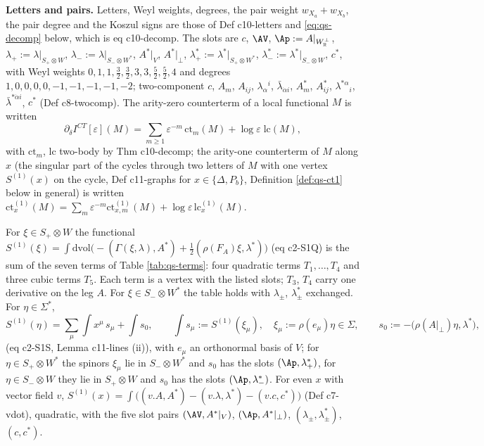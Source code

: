 \textbf{Letters and pairs.} Letters, Weyl weights, degrees, the pair weight $w_{X_a}+w_{X_b}$, the pair degree and the Koszul signs are those of Def c10-letters and \eqref{eq:qs-decomp} below, which is eq c10-decomp. The slots are $c$, $\AV$, $\Ap:=A|_{W_{\mathbb R}^\perp}$, $\lambda_+:=\lambda|_{S_+\otimes W}$, $\lambda_-:=\lambda|_{S_-\otimes W^*}$, $A^*|_V$, $A^*|_\perp$, $\lambda^*_+:=\lambda^*|_{S_+\otimes W^*}$, $\lambda^*_-:=\lambda^*|_{S_-\otimes W}$, $c^*$, with Weyl weights $0,1,1,\tfrac32,\tfrac32,3,3,\tfrac52,\tfrac52,4$ and degrees $1,0,0,0,0,-1,-1,-1,-1,-2$; two-component $c$, $A_m$, $A_{ij}$, $\lambda_\alpha{}^i$, $\bar\lambda_{\dot\alpha i}$, $A^*_m$, $A^*_{ij}$, $\lambda^{*\alpha}{}_i$, $\bar\lambda^{*\dot\alpha i}$, $c^*$ (Def c8-twocomp). The arity-zero counterterm of a local functional $M$ is written
\[
\partial_\delta I^{CT}[\varepsilon](M)=\sum_{m\ge1}\varepsilon^{-m}\,\mathrm{ct}_m(M)+\log\varepsilon\;\mathrm{lc}(M),
\]
with $\mathrm{ct}_m$, $\mathrm{lc}$ two-body by Thm c10-decomp; the arity-one counterterm of $M$ along $x$ (the singular part of the cycles through two letters of $M$ with one vertex $S^{(1)}(x)$ on the cycle, Def c11-graphs for $x\in\{\Delta,P_b\}$, Definition \ref{def:qs-ct1} below in general) is written $\mathrm{ct}^{(1)}_x(M)=\sum_m\varepsilon^{-m}\mathrm{ct}^{(1)}_{x,m}(M)+\log\varepsilon\,\mathrm{lc}^{(1)}_x(M)$.

\begin{definition}
\label{def:qs-terms}
For $\xi\in S_+\otimes W$ the functional $S^{(1)}(\xi)=\int\mathrm{dvol}\big(-(\Gamma(\xi,\lambda),A^*)+\tfrac12(\rho(F_A)\xi,\lambda^*)\big)$ (eq c2-S1Q) is the sum of the seven terms of Table \ref{tab:qs-terms}: four quadratic terms $T_1,\dots,T_4$ and three cubic terms $T_5$. Each term is a vertex with the listed slots; $T_3$, $T_4$ carry one derivative on the leg $A$. For $\xi\in S_-\otimes W^*$ the table holds with $\lambda_\pm$, $\lambda^*_\pm$ exchanged. For $\eta\in\Sigma^*$,
\begin{equation}
S^{(1)}(\eta)=\sum_\mu\int x^\mu\,s_\mu+\int s_0,\qquad \int s_\mu:=S^{(1)}(\xi_\mu),\quad \xi_\mu:=\rho(e_\mu)\eta\in\Sigma,\qquad s_0:=-\big(\rho(A|_\perp)\eta,\lambda^*\big),
\label{eq:qs-Seta}
\end{equation}
(eq c2-S1S, Lemma c11-lines (ii)), with $e_\mu$ an orthonormal basis of $V$; for $\eta\in S_+\otimes W^*$ the spinors $\xi_\mu$ lie in $S_-\otimes W^*$ and $s_0$ has the slots $(\Ap,\lambda^*_+)$, for $\eta\in S_-\otimes W$ they lie in $S_+\otimes W$ and $s_0$ has the slots $(\Ap,\lambda^*_-)$. For even $x$ with vector field $v$, $S^{(1)}(x)=\int\big((v.A,A^*)-(v.\lambda,\lambda^*)-(v.c,c^*)\big)$ (Def c7-vdot), quadratic, with the five slot pairs $(\AV,A^*|_V)$, $(\Ap,A^*|_\perp)$, $(\lambda_\pm,\lambda^*_\pm)$, $(c,c^*)$.
\end{definition}

